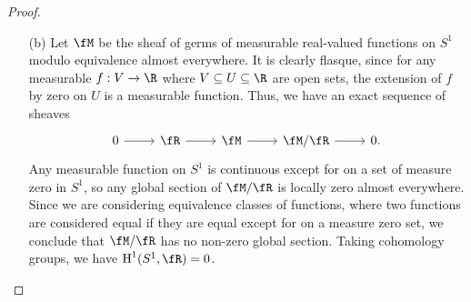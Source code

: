 \documentclass[a4paper]{article}
\begin{document}
\begin{enumerate} [label=\textbf{\arabic*.}, leftmargin=0em]
\begin{proof}
\begin{itemize} [leftmargin=0cm]
                        From here, $\Z$ will denote the constant sheaf on $A$. Identifying $A$ with the closed unit interval $[0, 1]$, we repeat the procedure above for $A$. Pick any $t \in (0, 1)$, say $t = 2^{-1}$. Then $X = [0, t]$ and $Y = [t, 1]$ cover $A$, so taking cohomology groups, we get a long exact sequence
                        \[ \begin{tikzcd}
                                0 \arrow[r]  & \cH^0(A, \Z) \arrow[r] & \cH^0(A, \Z_X) \oplus \cH^0(A, \Z_Y) \arrow[r] & \cH^0(A, \Z_{X \cap Y}) \arrow[r] & {}     \\
                                {} \arrow[r] & \cH^1(A, \Z) \arrow[r] & \cH^1(A, \Z_X) \oplus \cH^1(A, \Z_Y) \arrow[r] & \cH^1(A, \Z_{X \cap Y}) \arrow[r] & \cdots
                            \end{tikzcd} \]
                        Imitating the previous calculation, the first row is exact and $H^1(A, \Z_{X \cap Y}) = 0$ by (2.7) and (2.10). Thus, we reduce to the following exact sequence
                        \[ \begin{tikzcd}
                                0 \arrow[r] & \cH^1(A, \Z) \arrow[r] & \cH^1(A,\Z_X) \oplus \cH^1(A, \Z_Y) \arrow[r] & 0.
                            \end{tikzcd} \]
                        Since $X \cong A, B$, $\cH^1(A, \Z_X), H^1(A, \Z_Y) \cong H^1(A, \Z)$ by (2.10), which is possible if and only if $\cH^1(A, \Z) = 0$.

                  \item[(b)] Let $\fM$ be the sheaf of germs of measurable real-valued functions on $S^1$ modulo equivalence almost everywhere. It is clearly flasque, since for any measurable $f : V \to \R$ where $V \subseteq U \subseteq \R$ are open sets, the extension of $f$ by zero on $U$ is a measurable function. Thus, we have an exact sequence of sheaves
                        \[ \begin{tikzcd}
                                0 \arrow[r] & \fR \arrow[r] & \fM \arrow[r] & \fM/\fR \arrow[r] & 0.
                            \end{tikzcd} \]
                        Any measurable function on $S^1$ is continuous except for on a set of measure zero in $S^1$, so any global section of $\fM / \fR$ is locally zero almost everywhere. Since we are considering equivalence classes of functions, where two functions are considered equal if they are equal except for on a measure zero set, we conclude that $\fM / \fR$ has no non-zero global section. Taking cohomology groups, we have $\cH^1(S^1, \fR) = 0$.

              \end{itemize}
          \end{proof}

\end{enumerate}
\end{document}
